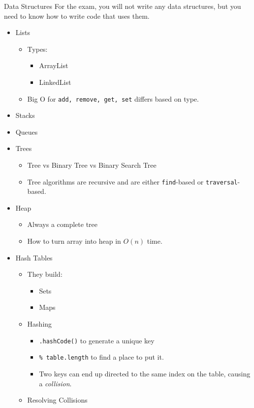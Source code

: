 \documentclass[]{article}
\begin{document}
Data Structures
For the exam, you will not write any data structures, but you need to know how to write code that uses them.
\begin{itemize}
	\item Lists
	\begin{itemize}
		\item Types:
		\begin{itemize}
			\item ArrayList
			\item LinkedList
		\end{itemize}
		\item Big O for \texttt{add, remove, get, set} differs based on type.
	\end{itemize}
	\item Stacks
	\item Queues
	\item Trees
	\begin{itemize}
		\item Tree vs Binary Tree vs Binary Search Tree
		\item Tree algorithms are recursive and are either \texttt{find}-based or \texttt{traversal}-based.
	\end{itemize}
	\item Heap
	\begin{itemize}
		\item Always a complete tree
		\item How to turn array into heap in $ O(n) $ time.
	\end{itemize}
	\item Hash Tables
	\begin{itemize}
		\item They build:
		\begin{itemize}
			\item Sets
			\item Maps
		\end{itemize}
		\item Hashing 
		\begin{itemize}
			\item \texttt{.hashCode()} to generate a unique key
			\item \texttt{\% table.length} to find a place to put it.
			\item Two keys can end up directed to the same index on the table, causing a \emph{collision}.
		\end{itemize}
		\item Resolving Collisions
		\begin{itemize}

\end{itemize}
\end{itemize}
\end{itemize}
\end{document}
